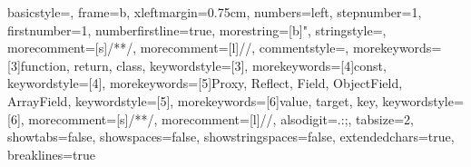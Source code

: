  {
  basicstyle={\footnotesize\ttfamily},
  frame=b,
  xleftmargin={0.75cm},
  numbers=left,
  stepnumber=1,
  firstnumber=1,
  numberfirstline=true,
  morestring=[b]",
  stringstyle=\color{editor-ocher}\ttfamily,
  morecomment=[s]{/*}{*/},
  morecomment=[l]//,
  commentstyle=\color{brown}\ttfamily,
  morekeywords=[3]{function, return, class},
  keywordstyle=[3]\color{light-red},
  morekeywords=[4]{const},
  keywordstyle=[4]\color{red},
  morekeywords=[5]{Proxy, Reflect, Field, ObjectField, ArrayField},
  keywordstyle=[5]\color{editor-green},
  morekeywords=[6]{value, target, key},
  keywordstyle=[6]\color{light-blue},
  morecomment=[s]{/*}{*/},
  morecomment=[l]//,
  alsodigit={.:;},
  tabsize=2,
  showtabs=false,
  showspaces=false,
  showstringspaces=false,
  extendedchars=true,
  breaklines=true
}